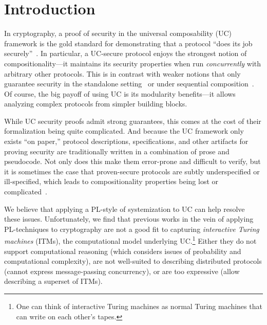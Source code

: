 \section{Introduction}
\label{sec:introduction}

In cryptography, a proof of security in the universal composability (UC)
framework is the gold standard for demonstrating that a protocol ``does its job
securely''~\cite{canetti2001universally}. In particular, a UC-secure protocol
enjoys the strongest notion of compositionality---it maintains its security
properties when run \emph{concurrently} with arbitrary other protocols. This is
in contrast with weaker notions that only guarantee security in the standalone
setting~\cite{lindell2014introduction} or under sequential
composition~\cite{goldreich1987play}. Of course, the big payoff of using UC is
its modularity benefits---it allows analyzing complex protocols from simpler
building blocks.

\begin{comment}
In a nutshell, security proofs in UC follow the real/ideal
paradigm~\cite{goldreich1987play}. The security requirements of a given task are
defined as a program for a \emph{single trusted process} called an \emph{ideal
  functionality}, which runs in an imagined ideal world. This serves as a
specification of the desired security properties for a distributed protocol
achieving the task across \emph{many unstrusted processes}, which runs in the
real world. Roughly speaking, we say that a protocol $\pi$ \emph{emulates} an
ideal functionality $\mc{F}$ (i.e., it meets its specification) if every
adversarial behavior in the real world can also be exhibited in the ideal world.
\end{comment}

While UC security proofs admit strong guarantees, this comes at the cost of
their formalization being quite complicated. And because the UC framework only
exists ``on paper,'' protocol descriptions, specifications, and other artifacts
for proving security are traditionally written in a combination of prose and
pseudocode. Not only does this make them error-prone and difficult to verify,
but it is sometimes the case that proven-secure protocols are subtly
underspecified or ill-specified, which leads to compositionality properties
being lost or complicated~\cite{camenisch2016universal}.

We believe that applying a PL-style of systemization to UC can help resolve
these issues. Unfortunately, we find that previous works in the vein of applying
PL-techniques to cryptography are not a good fit to capturing \emph{interactive
  Turing machines} (ITMs), the computational model underlying UC.\footnote{One
  can think of interactive Turing machines as normal Turing machines that can
  write on each other's tapes.} Either they do not support computational
reasoning (which considers issues of probability and computational complexity),
are not well-suited to describing distributed protocols (cannot express
message-passing concurrency), or are too expressive (allow describing a superset
of ITMs).


